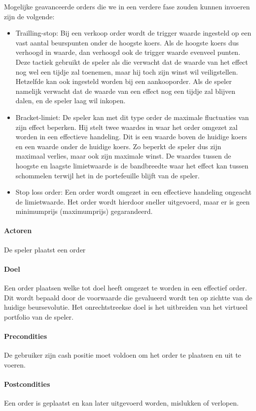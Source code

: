 Mogelijke geavanceerde orders die we in een verdere fase zouden kunnen invoeren zijn de volgende:
\begin{itemize}
	\item Trailling-stop: Bij een verkoop order wordt de trigger waarde ingesteld op een vast aantal beurspunten onder de hoogste koers. Als de hoogste koers dus verhoogd in waarde, dan verhoogd ook de trigger waarde evenveel punten. Deze tactiek gebruikt de speler als die verwacht dat de waarde van het effect nog wel een tijdje zal toenemen, maar hij toch zijn winst wil veiligstellen. Hetzelfde kan ook ingesteld worden bij een aankooporder. Als de speler namelijk verwacht dat de waarde van een effect nog een tijdje zal blijven dalen, en de speler laag wil inkopen.
  \item Bracket-limiet: De speler kan met dit type order de maximale fluctuaties van zijn effect beperken. Hij stelt twee waardes in waar het order omgezet zal worden in een effectieve handeling. Dit is een waarde boven de huidige koers en een waarde onder de huidige koers. Zo beperkt de speler dus zijn maximaal verlies, maar ook zijn maximale winst. De waardes tussen de hoogste en laagste limietwaarde is de bandbreedte waar het effect kan tussen schommelen terwijl het in de portefeuille blijft van de speler.
  \item Stop loss order: Een order wordt omgezet in een effectieve handeling ongeacht de limietwaarde. Het order wordt hierdoor sneller uitgevoerd, maar er is geen minimumprijs (maximumprijs) gegarandeerd.
\end{itemize}

\paragraph{Actoren} De speler plaatst een order
\paragraph{Doel} Een order plaatsen welke tot doel heeft omgezet te worden in een effectief order. Dit wordt bepaald door de voorwaarde die gevalueerd wordt ten op zichtte van de huidige beursevolutie. Het onrechtstreekse doel is het uitbreiden van het virtueel portfolio van de speler.
\paragraph{Precondities} De gebruiker zijn cash positie moet voldoen om het order te plaatsen en uit te voeren.
\paragraph{Postcondities} Een order is geplaatst en kan later uitgevoerd worden, mislukken of verlopen.
